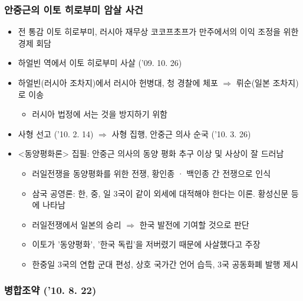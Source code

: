 \subsubsection*{안중근의 이토 히로부미 암살 사건}

\begin{itemize}
    \item 전 통감 이토 히로부미, 러시아 재무상 코코프초프가 만주에서의 이익 조정을 위한 경제 회담
    \item 하얼빈 역에서 이토 히로부미 사살 ('09. 10. 26)
    \item 하얼빈(러시아 조차지)에서 러시아 헌병대, 청 경찰에 체포 $\Rightarrow$ 뤼순(일본 조차지)로 이송
    \begin{itemize}
        \item 러시아 법정에 서는 것을 방지하기 위함
    \end{itemize}
    \item 사형 선고 ('10. 2. 14) $\Rightarrow$ 사형 집행, 안중근 의사 순국 ('10. 3. 26)
    \item \textless{}동양평화론\textgreater{} 집필: 안중근 의사의 동양 평화 추구 이상 및 사상이 잘 드러남
    \begin{itemize}
        \item 러일전쟁을 동양평화를 위한 전쟁, 황인종 · 백인종 간 전쟁으로 인식
        \item 삼국 공영론: 한, 중, 일 3국이 같이 외세에 대적해야 한다는 이론. 황성신문 등에 나타남
        \item 러일전쟁에서 일본의 승리 $\Rightarrow$ 한국 발전에 기여할 것으로 판단
        \item 이토가 '동양평화', '한국 독립'을 저버렸기 때문에 사살했다고 주장
        \item 한중일 3국의 연합 군대 편성, 상호 국가간 언어 습득, 3국 공동화폐 발행 제시
    \end{itemize}
\end{itemize}

\subsubsection*{병합조약 ('10. 8. 22)}

